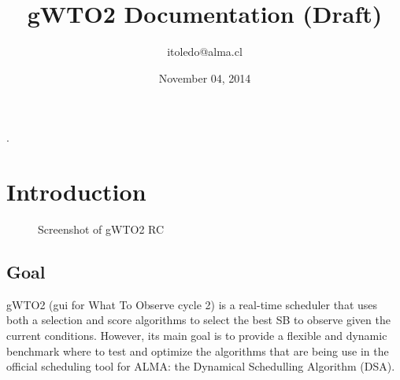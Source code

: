 \documentclass[a4paper,10pt,english]{sphinxmanual}
\title{gWTO2 Documentation (Draft)}
\date{November 04, 2014}
\author{itoledo@alma.cl}
\begin{document}
\maketitle
\tableofcontents
{}\label{index::doc}


.


\chapter{Introduction}
\label{intro2:introduction}\label{intro2:gwto2-documentation-contents}\label{intro2::doc}\begin{figure}[htbp]
\centering
\capstart

\caption{Screenshot of gWTO2 RC}\end{figure}


\section{Goal}
\label{intro2:goal}
gWTO2 (gui for What To Observe cycle 2) is a real-time scheduler that uses both
a selection and score algorithms to select the best SB to observe given the
current conditions. However, its main goal is to provide a flexible and dynamic
benchmark where to test and optimize the algorithms that are being use in the
official scheduling tool for ALMA: the Dynamical Schedulling Algorithm (DSA).
\end{document}
